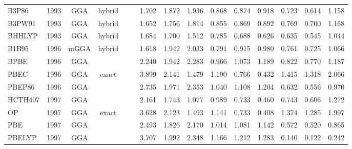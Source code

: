 \begin{landscape}
\begin{longtable}{ll:cccc:rrr:rrr:rrr}
    B3P86            & 1993 & GGA  & hybrid   &             &           & 1.702             & 1.872             & 1.936  & 0.868              & 0.874             & 0.918  & 0.723   & 0.614 & 1.158 \\
    B3PW91           & 1993 & GGA  & hybrid   &             &           & 1.652             & 1.756             & 1.814  & 0.855              & 0.869             & 0.892  & 0.769   & 0.700 & 1.168 \\
    BHHLYP           & 1993 & GGA  & hybrid   &             &           & 1.684             & 1.700             & 1.512  & 0.785              & 0.688             & 0.626  & 0.635   & 0.545 & 1.044 \\
    B1B95            & 1996 & mGGA & hybrid   &             &           & 1.618             & 1.942             & 2.033  & 0.791              & 0.915             & 0.980  & 0.761   & 0.725 & 1.066 \\
    BPBE             & 1996 & GGA  &          &             &           & 2.240             & 1.942             & 2.283  & 0.966              & 1.073             & 1.189  & 0.822   & 0.770 & 1.187 \\
    PBEC             & 1996 & GGA  & exact    &             &           & 3.899             & 2.141             & 1.479  & 1.190              & 0.766             & 0.432  & 1.415   & 1.318 & 2.066 \\
    PBEP86           & 1996 & GGA  &          &             &           & 2.735             & 1.971             & 2.353  & 1.040              & 1.108             & 1.204  & 0.632   & 0.556 & 0.970 \\
    HCTH407          & 1997 & GGA  &          &             &           & 2.161             & 1.743             & 1.077  & 0.989              & 0.733             & 0.460  & 0.743   & 0.606 & 1.272 \\
    OP               & 1997 & GGA  & exact    &             &           & 3.628             & 2.123             & 1.493  & 1.141              & 0.733             & 0.408  & 1.374   & 1.285 & 1.997 \\
    PBE              & 1997 & GGA  &          &             &           & 2.493             & 1.826             & 2.170  & 1.014              & 1.081             & 1.142  & 0.572   & 0.520 & 0.865 \\
    PBELYP           & 1997 & GGA  &          &             &           & 3.707             & 1.992             & 2.348  & 1.166              & 1.212             & 1.283  & 0.140   & 0.122 & 0.242 \\

\end{longtable}
\end{landscape}
